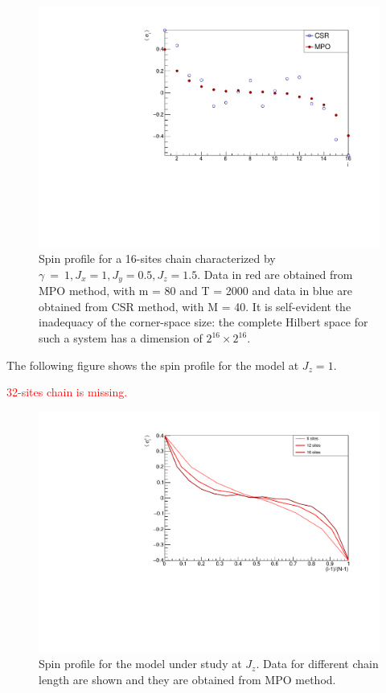 \begin{figure}[H]
    \centering
    \includegraphics[scale=0.7]{Figures/16sites/LMComparison16s1051.pdf}
    \caption{Spin profile for a 16-sites chain characterized by $\gamma~=~1, J_x=1, J_y=0.5, J_z=1.5$. Data in red are obtained from MPO method, with m = 80 and T = 2000 and data in blue are obtained from CSR method, with M = 40. It is self-evident the inadequacy of the corner-space size: the complete Hilbert space for such a system has a dimension of $2^{16} \times 2^{16}$.}
    \label{fig:my_label}
\end{figure}

The following figure shows the spin profile for the model at $J_z = 1$. 

\textcolor{red}{32-sites chain is missing.}

\begin{figure}[H]
    \centering
    \includegraphics[scale=0.7]{Figures/NORM_LM_comparisonVSsize.pdf}
    \caption{Spin profile for the model under study at $J_z$. Data for different chain length are shown and they are obtained from MPO method.}
    \label{fig:my_label}
\end{figure}


